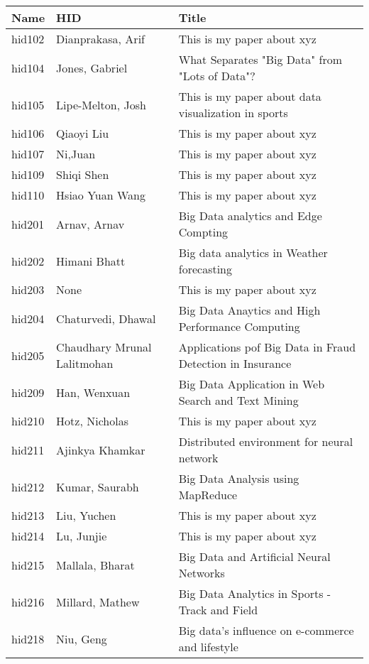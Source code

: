 \documentclass[12pt]{article}
\begin{document}
\begin{footnotesize}
\begin{longtable}{|p{1cm}p{5cm}p{9cm}|}
\hline \textbf{Name} & \textbf{HID} & \textbf{Title} \\ \hline \hline

hid102 & Dianprakasa, Arif & This is my paper about xyz  \\
\hline
hid104 & Jones, Gabriel & What Separates "Big Data" from "Lots of Data"?  \\
\hline
hid105 & Lipe-Melton, Josh & This is my paper about data visualization in sports  \\
\hline
hid106 & Qiaoyi Liu & This is my paper about xyz  \\
\hline
hid107 & Ni,Juan & This is my paper about xyz  \\
\hline
hid109 & Shiqi Shen & This is my paper about xyz  \\
\hline
hid110 & Hsiao Yuan Wang & This is my paper about xyz  \\
\hline
hid201 & Arnav, Arnav & Big Data analytics and Edge Compting  \\
\hline
hid202 & Himani Bhatt & Big data analytics in Weather forecasting  \\
\hline
hid203 & None & This is my paper about xyz  \\
\hline
hid204 & Chaturvedi, Dhawal & Big Data Anaytics and High Performance Computing  \\
\hline
hid205 & Chaudhary Mrunal Lalitmohan & Applications pof Big Data in Fraud Detection in Insurance  \\
\hline
hid209 & Han, Wenxuan & Big Data Application in Web Search and Text Mining  \\
\hline
hid210 & Hotz, Nicholas & This is my paper about xyz  \\
\hline
hid211 & Ajinkya Khamkar & Distributed environment for neural network  \\
\hline
hid212 & Kumar, Saurabh & Big Data Analysis using MapReduce  \\
\hline
hid213 & Liu, Yuchen & This is my paper about xyz  \\
\hline
hid214 & Lu, Junjie & This is my paper about xyz  \\
\hline
hid215 & Mallala, Bharat & Big Data and Artificial Neural Networks  \\
\hline
hid216 & Millard, Mathew & Big Data Analytics in Sports - Track and Field  \\
\hline
hid218 & Niu, Geng & Big data's influence on e-commerce and lifestyle  \\

\end{longtable}
\end{footnotesize}
\end{document}
